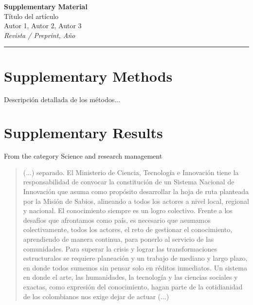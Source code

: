 \documentclass[12pt]{article}
\begin{document}
	
	\begin{center}
		{\LARGE \textbf{Supplementary Material}}\\[0.5em]
		{\large Título del artículo}\\[0.3em]
		Autor 1, Autor 2, Autor 3\\[0.3em]
		\textit{Revista / Preprint, Año}
	\end{center}
	
	\vspace{1em}
	\hrule
	\vspace{1em}
	
	\tableofcontents
	\newpage
	
	\section{Supplementary Methods}
	
	Descripción detallada de los métodos...
	
	\section{Supplementary Results}
	
	From the category Science and research management
	
	\begin{quote}
		(...) separado. El Ministerio de Ciencia, Tecnología e Innovación tiene la responsabilidad de convocar la constitución de un Sistema Nacional de Innovación que asuma como propósito desarrollar la hoja de ruta planteada por la Misión de Sabios, alineando a todos los actores a nivel local, regional y nacional. El conocimiento siempre es un logro colectivo. Frente a los desafíos que afrontamos como país, es necesario que asumamos colectivamente, todos los actores, el reto de gestionar el conocimiento, aprendiendo de manera continua, para ponerlo al servicio de las comunidades. Para superar la crisis y lograr las transformaciones estructurales se requiere planeación y un trabajo de mediano y largo plazo, en donde todos sumemos sin pensar solo en réditos inmediatos. Un sistema en donde el arte, las humanidades, la tecnología y las ciencias sociales y exactas, como expresión del conocimiento, hagan parte de la cotidianidad de los colombianos nos exige dejar de actuar (...)
		
	\end{quote}
	
\end{document}
